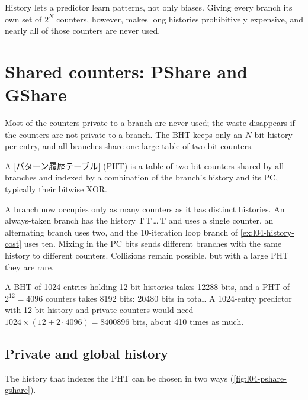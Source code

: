 \documentclass[../main.tex]{subfiles}
\begin{document}
\begin{keypoint}
  History lets a predictor learn patterns, not only biases.  Giving every
  branch its own set of $2^N$ counters, however, makes long histories
  prohibitively expensive, and nearly all of those counters are never used.
\end{keypoint}

\section{Shared counters: PShare and GShare}
\label{sec:l04-share}

Most of the counters private to a branch are never used; the waste disappears
if the counters are not private to a branch.
The BHT keeps only an $N$-bit history per entry, and all branches share one
large table of two-bit counters.

\begin{definition}
  A [パターン履歴テーブル]
  (PHT) is a table of two-bit counters shared by all
  branches and indexed by a combination of the branch's history and its PC,
  typically their bitwise XOR.
\end{definition}

A branch now occupies only as many counters as it has distinct histories.
An always-taken branch has the history T\,T\,\ldots\,T and uses a single
counter, an alternating branch uses two, and the 10-iteration loop branch of
\cref{ex:l04-history-cost} uses ten.  Mixing in the PC bits sends different
branches with the same history to different counters.  Collisions remain
possible, but with a large PHT they are rare.

\begin{example}
  A BHT of 1024 entries holding 12-bit histories takes \num{12288} bits, and
  a PHT of $2^{12} = 4096$ counters takes \num{8192} bits: \num{20480} bits
  in total.  A 1024-entry predictor with 12-bit history and private counters
  would need $1024 \times (12 + 2\cdot 4096) = \num{8400896}$ bits, about
  410 times as much.
\end{example}

\subsection{Private and global history}

The history that indexes the PHT can be chosen in two ways
(\cref{fig:l04-pshare-gshare}).
\end{document}
